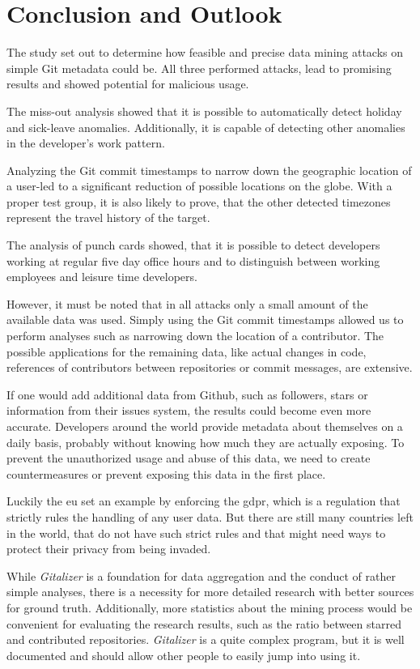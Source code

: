 \chapter{Conclusion and Outlook}

The study set out to determine how feasible and precise data mining attacks on simple Git metadata could be.
All three performed attacks, lead to promising results and showed potential for malicious usage.

The miss-out analysis showed that it is possible to automatically detect holiday and sick-leave anomalies.
Additionally, it is capable of detecting other anomalies in the developer's work pattern.

Analyzing the Git commit timestamps to narrow down the geographic location of a user-led to a significant reduction of possible locations on the globe.
With a proper test group, it is also likely to prove, that the other detected timezones represent the travel history of the target.

The analysis of punch cards showed, that it is possible to detect developers working at regular five day office hours and to distinguish between working employees and leisure time developers.

However, it must be noted that in all attacks only a small amount of the available data was used.
Simply using the Git commit timestamps allowed us to perform analyses such as narrowing down the location of a contributor.
The possible applications for the remaining data, like actual changes in code, references of contributors between repositories or commit messages, are extensive.

If one would add additional data from Github, such as followers, stars or information from their issues system, the results could become even more accurate.
Developers around the world provide metadata about themselves on a daily basis, probably without knowing how much they are actually exposing.
To prevent the unauthorized usage and abuse of this data, we need to create countermeasures or prevent exposing this data in the first place.

Luckily the \ac{eu} set an example by enforcing the \ac{gdpr}, which is a regulation that strictly rules the handling of any user data.
But there are still many countries left in the world, that do not have such strict rules and that might need ways to protect their privacy from being invaded.

While \emph{Gitalizer} is a foundation for data aggregation and the conduct of rather simple analyses, there is a necessity for more detailed research with better sources for ground truth.
Additionally, more statistics about the mining process would be convenient for evaluating the research results, such as the ratio between starred and contributed repositories.
\emph{Gitalizer} is a quite complex program, but it is well documented and should allow other people to easily jump into using it.

